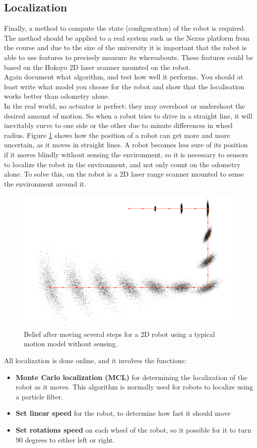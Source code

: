 \subsection{Localization}
\label{sec::localisation}
Finally, a method to compute the state (configuration) of the robot is required. The method should be applied to a real system such as the Nexus platform from the course and due to the size of the university it is important that the robot is able to use features to precisely measure its whereabouts. These features could be based on the Hokoyo 2D laser scanner mounted on the robot.\\[0.2cm]
Again document what algorithm, and test how well it performs. You should at least write what model you choose for the robot and show that the localisation works better than odometry alone.\\[0.2cm]
In the real world, no actuator is perfect: they may overshoot or undershoot the desired amount of motion. So when a robot tries to drive in a straight line, it will inevitably curve to one side or the other due to minute differences in wheel radius. Figure \ref{fig::MC_test} shows how the position of a robot can get more and more uncertain, as it moves in straight lines. A robot becomes less sure of its position if it moves blindly without sensing the environment, so it is necessary to sensors to localize the robot in the environment, and not only count on the odometry alone. To solve this, on the robot is a 2D laser range scanner mounted to sense the environment around it.
\begin{figure}[H]
\centering
\includegraphics[scale=0.43]{img/MCtest.png}
\caption{Belief after moving several steps for a 2D robot using a typical motion model without sensing.}
\label{fig::MC_test}
\end{figure}
All localization is done online, and it involves the functions:
\begin{itemize}\itemsep-2pt
\item \textbf{Monte Carlo localization (MCL)} for determining the localization of the robot as it moves. This algorithm is normally used for robots to localize using a particle filter.
\item \textbf{Set linear speed} for the robot, to determine how fast it should move
\item \textbf{Set rotations speed} on each wheel of the robot, so it possible for it to turn 90 degrees to either left or right.  
\end{itemize}
\newpage
